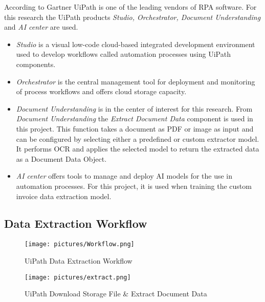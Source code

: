 According to Gartner \cite{gartner2023magicquadrant} UiPath is one of the leading vendors of \acl{RPA} software. For this research the UiPath products \textit{Studio, Orchestrator, Document Understanding} and \textit{AI center} are used. 
\begin{itemize}
    \item \textit{Studio} is a visual low-code cloud-based integrated development environment used to develop workflows called automation processes using UiPath components. 
    \item \textit{Orchestrator} is the central management tool for deployment and monitoring of process workflows and offers cloud storage capacity. 
    \item \textit{Document Understanding} is in the center of interest for this research. From \textit{Document Understanding} the \textit{Extract Document Data} component is used in this project. This function takes a document as PDF or image as input and can be configured by selecting either a predefined or custom extractor model. It performs \ac{OCR} and applies the selected model to return the extracted data as a Document Data Object.
    \item \textit{AI center} offers tools to manage and deploy \ac{AI} models for the use in automation processes. For this project, it is used when training the custom invoice data extraction model. \cite{uipath}
\end{itemize}

\subsection{Data Extraction Workflow}
\begin{figure}[ht]
    \centering 
    \texttt{[image: pictures/Workflow.png]}
    \caption{UiPath Data Extraction Workflow}
    \label{pic:UiPath_1}    %
\end{figure}
\begin{figure}[ht]
    \centering 
    \texttt{[image: pictures/extract.png]}
    \caption{UiPath Download Storage File \& Extract Document Data}
    \label{pic:UiPath_2}    %
\end{figure}

